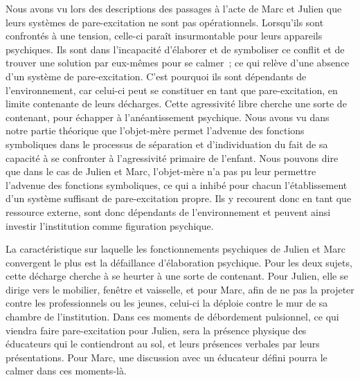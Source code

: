 \documentclass[12pt, a4paper]{book}
\begin{document}
\begin{spacing}{1.5}
Nous avons vu lors des descriptions des passages à l'acte de Marc et Julien  que leurs systèmes de pare-excitation ne sont pas opérationnels. Lorsqu'ils sont confrontés à une tension, celle-ci paraît insurmontable pour leurs appareils psychiques. Ils sont dans l'incapacité d'élaborer et de symboliser ce conflit et de trouver une solution par eux-mêmes pour se calmer ; ce qui relève d'une absence d'un système de pare-excitation. C'est pourquoi ils sont dépendants de l'environnement, car celui-ci peut se constituer en tant que pare-excitation, en limite contenante de leurs décharges. Cette agressivité libre cherche une sorte de contenant, pour échapper à l'anéantissement psychique. Nous avons vu dans notre partie théorique que l'objet-mère permet l'advenue des fonctions symboliques dans le processus de séparation et d'individuation du fait de sa capacité à se confronter à l'agressivité primaire de l'enfant. Nous pouvons dire que dans le cas de Julien et Marc, l'objet-mère n'a pas pu leur permettre l'advenue des fonctions symboliques, ce qui a inhibé pour chacun l'établissement d'un système suffisant de pare-excitation propre. Ils y recourent donc en tant que ressource externe, sont donc dépendants de l'environnement et peuvent ainsi investir l'institution comme figuration psychique. 

La caractéristique sur laquelle les fonctionnements psychiques de Julien et Marc convergent le plus est la défaillance d'élaboration psychique. Pour les deux sujets, cette décharge cherche à se heurter à une sorte de contenant. Pour Julien, elle  se dirige  vers le mobilier, fenêtre et vaisselle, et pour Marc, afin de ne pas la projeter contre les professionnels ou les jeunes, celui-ci la déploie contre le mur de sa chambre de l'institution. Dans ces moments de débordement pulsionnel, ce qui viendra faire pare-excitation pour Julien, sera la présence physique des éducateurs qui le contiendront au sol, et leurs présences verbales par leurs présentations. Pour Marc, une discussion avec un éducateur défini pourra le calmer dans ces moments-là. 


\end{spacing}
\end{document}
